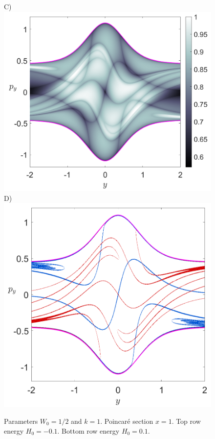 \documentclass[10pt,aps,onecolumn,superscriptaddress]{revtex4-2}
\begin{document}
\begin{figure}[htbp]
	C)\includegraphics[scale=0.28]{H_01_LD_tau_12_x_1.png}
	D)\includegraphics[scale=0.28]{H_01_mani_tau_12_x_1.png}
	\caption{Parameters $W_0 = 1/2$ and $k = 1$. Poincar\'e section $x = 1$. Top row energy $H_0 = -0.1$. Bottom row energy $H_0 = 0.1$.}
	\label{fig:ld_mani_x_1}
\end{figure}
\end{document}
